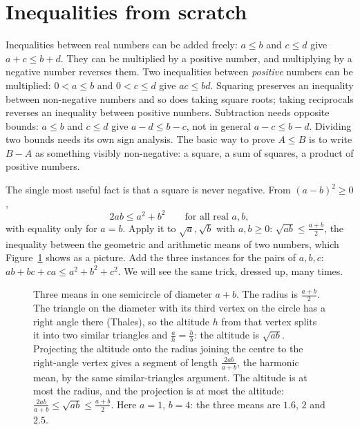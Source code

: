 \section{Inequalities from scratch}

\begin{reminder}
Inequalities between real numbers can be added freely: $a\le b$ and $c\le d$ give $a+c\le b+d$. They can be multiplied by a positive number,
and multiplying by a negative number reverses them. Two inequalities between \emph{positive} numbers can be multiplied: $0<a\le b$ and $0<c\le d$
give $ac\le bd$. Squaring preserves an inequality between non-negative numbers and so does taking square roots; taking reciprocals reverses an
inequality between positive numbers. Subtraction needs opposite bounds: $a\le b$ and $c\le d$ give
$a-d\le b-c$, not in general $a-c\le b-d$. Dividing two bounds needs its own sign analysis. The basic way to prove $A\le B$ is to write $B-A$ as something
visibly non-negative: a square, a sum of squares, a product of positive numbers.
\end{reminder}

The single most useful fact is that a square is never negative. From $(a-b)^2\ge0$,
\[
2ab\le a^2+b^2\qquad\text{for all real }a,b,
\]
with equality only for $a=b$. Apply it to $\sqrt a,\sqrt b$ with $a,b\ge0$: $\sqrt{ab}\le\frac{a+b}2$, the inequality between the geometric and
arithmetic means of two numbers, which Figure~\ref{fig:semicircle} shows as a picture. Add the three instances for the pairs of $a,b,c$:
$ab+bc+ca\le a^2+b^2+c^2$. We will see the same trick, dressed up, many times.

\begin{figure}[ht]
\centering
{}
\caption{Three means in one semicircle of diameter $a+b$. The radius is $\frac{a+b}2$. The triangle on the diameter with its third vertex on the circle has a right angle there (Thales), so the altitude $h$ from that vertex splits it into two similar triangles and $\frac ah=\frac hb$: the altitude is $\sqrt{ab}$. Projecting the altitude onto the radius joining the centre to the right-angle vertex gives a segment of length $\frac{2ab}{a+b}$, the harmonic mean, by the same similar-triangles argument. The altitude is at most the radius, and the projection is at most the altitude: $\frac{2ab}{a+b}\le\sqrt{ab}\le\frac{a+b}2$. Here $a=1$, $b=4$: the three means are $1.6$, $2$ and $2.5$.}
\label{fig:semicircle}
\end{figure}

